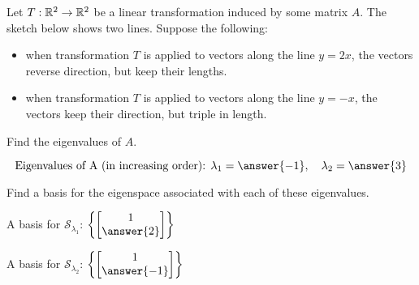 \documentclass{ximera}
\author{}
\begin{document}
\begin{exercise}
Let $T:\mathbb{R}^2\rightarrow \mathbb{R}^2$ be a linear transformation induced by some matrix $A$.  The sketch below shows two lines.  Suppose the following: 
\begin{itemize} 
\item when transformation $T$ is applied to vectors along the line $y=2x$, the vectors reverse direction, but keep their lengths.  
\item when transformation $T$ is applied to vectors along the line $y=-x$, the vectors keep their direction, but triple in length. 
\end{itemize}

 \begin{center}
 \end{center}

Find the eigenvalues of $A$.

$$\text{Eigenvalues of A (in increasing order): }\lambda_1=\answer{-1}, \quad\lambda_2=\answer{3}$$

Find a basis for the eigenspace associated with each of these eigenvalues.

A basis for $\mathcal{S}_{\lambda_1}$: $\left\{\begin{bmatrix}1\\\answer{2}\end{bmatrix}\right\}$

A basis for $\mathcal{S}_{\lambda_2}$: $\left\{\begin{bmatrix}1\\\answer{-1}\end{bmatrix}\right\}$


 \end{exercise}
 
\end{document}
